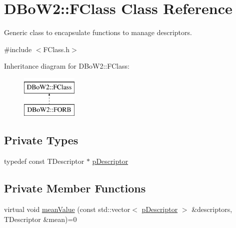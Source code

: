 \hypertarget{class_d_bo_w2_1_1_f_class}{}\section{D\+Bo\+W2\+:\+:F\+Class Class Reference}
\label{class_d_bo_w2_1_1_f_class}


Generic class to encapsulate functions to manage descriptors.  




{\ttfamily \#include $<$F\+Class.\+h$>$}

Inheritance diagram for D\+Bo\+W2\+:\+:F\+Class\+:\begin{figure}[H]
\begin{center}
\leavevmode
\includegraphics[height=2.000000cm]{class_d_bo_w2_1_1_f_class}
\end{center}
\end{figure}
\subsection*{Private Types}
\begin{DoxyCompactItemize}
\item 
typedef const T\+Descriptor $\ast$ \mbox{\hyperlink{class_d_bo_w2_1_1_f_class_a9c94e662003f61413fd542d67b45c3a9}{p\+Descriptor}}
\end{DoxyCompactItemize}
\subsection*{Private Member Functions}
\begin{DoxyCompactItemize}
\item 
virtual void \mbox{\hyperlink{class_d_bo_w2_1_1_f_class_a2f5859fa3acdf4f2a8a64d7e09de54ab}{mean\+Value}} (const std\+::vector$<$ \mbox{\hyperlink{class_d_bo_w2_1_1_f_class_a9c94e662003f61413fd542d67b45c3a9}{p\+Descriptor}} $>$ \&descriptors, T\+Descriptor \&mean)=0
\end{DoxyCompactItemize}
